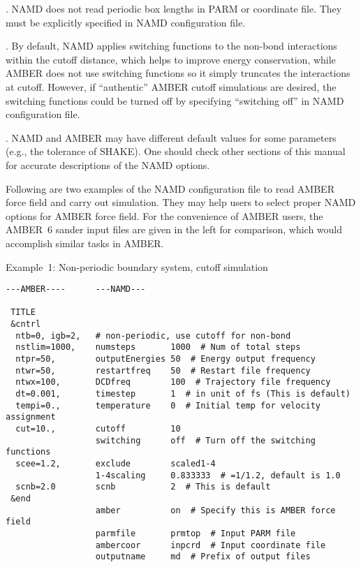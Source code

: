 . NAMD does not read periodic box lengths in PARM or
coordinate file. They must be explicitly specified in NAMD
configuration file.

. By default, NAMD applies switching functions to
the non-bond interactions within the cutoff distance,
which helps to improve energy conservation, while AMBER does not
use switching functions so it simply
truncates the interactions at cutoff. However, if ``authentic''
AMBER cutoff simulations are desired, the switching functions
could be turned off by specifying ``switching off'' in NAMD
configuration file.

. NAMD and AMBER may have different default values for
some parameters (e.g., the tolerance of SHAKE). One should check
other sections of this manual for accurate descriptions
of the NAMD options.
\newline

Following are two examples of the NAMD configuration file to read
AMBER force field and carry out simulation. They may help users
to select proper NAMD options for AMBER force field. For the
convenience of AMBER users, the AMBER~6 sander input files are
given in the left for comparison, which would accomplish similar
tasks in AMBER.
\newline

\noindent Example~1: Non-periodic boundary system, cutoff simulation

\begin{verbatim}
---AMBER----      ---NAMD---

 TITLE
 &cntrl
  ntb=0, igb=2,   # non-periodic, use cutoff for non-bond
  nstlim=1000,    numsteps       1000  # Num of total steps
  ntpr=50,        outputEnergies 50  # Energy output frequency
  ntwr=50,        restartfreq    50  # Restart file frequency
  ntwx=100,       DCDfreq        100  # Trajectory file frequency
  dt=0.001,       timestep       1  # in unit of fs (This is default)
  tempi=0.,       temperature    0  # Initial temp for velocity assignment
  cut=10.,        cutoff         10
                  switching      off  # Turn off the switching functions
  scee=1.2,       exclude        scaled1-4
                  1-4scaling     0.833333  # =1/1.2, default is 1.0
  scnb=2.0        scnb           2  # This is default
 &end
                  amber          on  # Specify this is AMBER force field
                  parmfile       prmtop  # Input PARM file
                  ambercoor      inpcrd  # Input coordinate file
                  outputname     md  # Prefix of output files
\end{verbatim}

